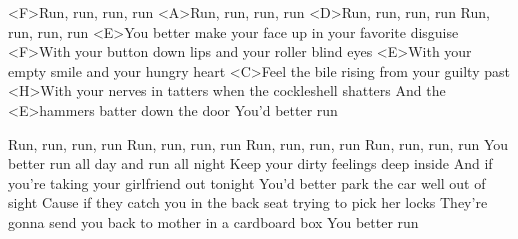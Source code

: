 
\zs
<F>Run, run, run, run
<A>Run, run, run, run
<D>Run, run, run, run
Run, run, run, run
<E>You better make your face up in your favorite disguise
<F>With your button down lips and your roller blind eyes
<E>With your empty smile and your hungry heart
<C>Feel the bile rising from your guilty past
<H>With your nerves in tatters when the cockleshell shatters
And the <E>hammers batter down the door
You'd better run
\ks

\zs
Run, run, run, run
Run, run, run, run
Run, run, run, run
Run, run, run, run
You better run all day and run all night
Keep your dirty feelings deep inside
And if you're taking your girlfriend out tonight
You'd better park the car well out of sight
Cause if they catch you in the back seat trying to pick her locks
They're gonna send you back to mother in a cardboard box
You better run
\ks

\kp
